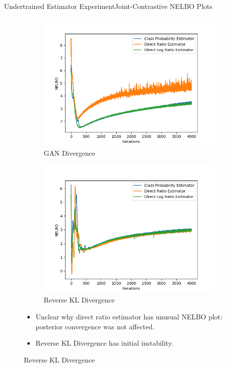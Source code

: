 \documentclass{beamer}
\begin{document}
\begin{frame}{Undertrained Estimator Experiment}{Joint-Contrastive NELBO Plots}
\begin{figure}
\begin{subfigure}{0.49\textwidth}
\includegraphics[width=\linewidth]{part2nelbos/JCADVvsJCADVexpvsJCADVgudlog.png}
\caption{GAN Divergence}
\end{subfigure}
\begin{subfigure}{0.49\textwidth}
\includegraphics[width=\linewidth]{part2nelbos/JCKLDvsJCKLexpvsJCKLgudlog.png}
\caption{Reverse KL Divergence}
\end{subfigure}
\begin{itemize}
\item Unclear why direct ratio estimator has unusual NELBO plot: posterior convergence was not affected.
\item Reverse KL Divergence has initial instability.
\end{itemize}
\end{figure}
\end{frame}
\end{document}
